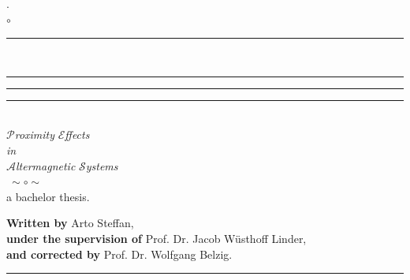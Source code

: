\documentclass[twoside,a4paper]{article}
\begin{document}

\newcommand{\rem}[1]{\textcolor{TamGreen}{#1}}
\thispagestyle{empty}
\begin{center} 
    \noindent\Huge.\\
    \noindent$\circ$\\
    \rule{0.1\textwidth}{0.75pt}\\
    \rule[20pt]{0.17\textwidth}{0.75pt} \rule[20pt]{0.5\textwidth}{0.75pt} \rule[20pt]{0.17\textwidth}{0.75pt}\\
    \vspace*{30pt}
    \Huge $\mathcal{P}$\textit{roximity} $\mathcal{E}$\textit{ffects}\\
     \textit{in}\\ 
    $\mathcal{A}$\textit{ltermagnetic}  $\mathcal{S}$\textit{ystems}
    \vspace*{12pt}\\
    $~\sim\circ\sim~$
    \vspace*{48pt}\\
    \normalsize
 a bachelor thesis.\\

\end{center}
\vspace*{60pt}
\noindent
\normalsize
\textbf{Written by} Arto Steffan, \\
\textbf{under the supervision of} Prof. Dr. Jacob Wüsthoff Linder, \\
\textbf{and corrected by} Prof. Dr. Wolfgang Belzig.\\
\vspace*{124pt}
\begin{center}
    \rule{.4\textwidth}{0.4pt}
\end{center}
\vspace*{12pt}
\end{document}
